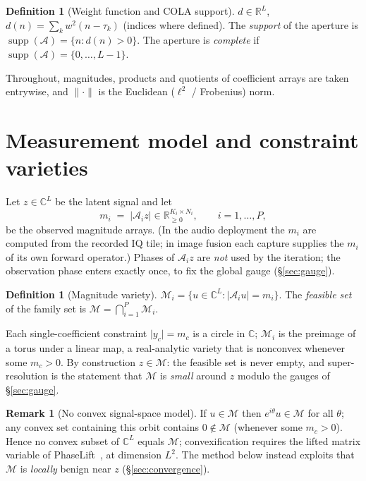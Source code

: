 \documentclass[11pt]{article}
\theoremstyle{definition}
\newtheorem{definition}[theorem]{Definition}
\newtheorem{remark}[theorem]{Remark}
\newcommand{\C}{\mathbb{C}}
\newcommand{\R}{\mathbb{R}}
\newcommand{\cA}{\mathcal{A}}
\newcommand{\cM}{\mathcal{M}}
\newcommand{\norm}[1]{\lVert #1\rVert}
\newcommand{\abs}[1]{\lvert #1\rvert}
\newcommand{\supp}{\operatorname{supp}}
\begin{document}
\begin{definition}[Weight function and COLA support]
$d\in\R^{L}$, $d(n)=\sum_{k} w^{2}(n-\tau_{k})$ (indices where defined).
The \emph{support} of the aperture is $\supp(\cA)=\{n: d(n)>0\}$.  The
aperture is \emph{complete} if $\supp(\cA)=\{0,\dots,L-1\}$.
\end{definition}

Throughout, magnitudes, products and quotients of coefficient arrays are
taken entrywise, and $\norm{\cdot}$ is the Euclidean ($\ell^{2}$ /
Frobenius) norm.

\section{Measurement model and constraint varieties}

Let $z\in\C^{L}$ be the latent signal and let
\[
  m_{i}\;=\;\abs{\cA_{i}z}\in\R_{\ge0}^{K_{i}\times N_{i}},
  \qquad i=1,\dots,P,
\]
be the observed magnitude arrays.  (In the audio deployment the $m_i$ are
computed from the recorded IQ tile; in image fusion each capture supplies
the $m_i$ of its own forward operator.)  Phases of $\cA_i z$ are
\emph{not} used by the iteration; the observation phase enters exactly once,
to fix the global gauge (\S\ref{sec:gauge}).

\begin{definition}[Magnitude variety]
$\cM_{i}=\{u\in\C^{L}: \abs{\cA_{i}u}=m_{i}\}$.  The \emph{feasible set} of
the family set is $\cM=\bigcap_{i=1}^{P}\cM_{i}$.
\end{definition}

Each single-coefficient constraint $\abs{y_c}=m_c$ is a circle in $\C$;
$\cM_i$ is the preimage of a torus under a linear map, a real-analytic
variety that is nonconvex whenever some $m_c>0$.  By construction
$z\in\cM$: the feasible set is never empty, and super-resolution is the
statement that $\cM$ is \emph{small} around $z$ modulo the gauges of
\S\ref{sec:gauge}.

\begin{remark}[No convex signal-space model]\label{rem:convex}
If $u\in\cM$ then $e^{i\theta}u\in\cM$ for all $\theta$; any convex set
containing this orbit contains $0\notin\cM$ (whenever some $m_c>0$).  Hence
no convex subset of $\C^{L}$ equals $\cM$; convexification requires the
lifted matrix variable of PhaseLift~\cite{candes2013}, at dimension
$L^{2}$.  The method below instead exploits that $\cM$ is
\emph{locally} benign near $z$ (\S\ref{sec:convergence}).
\end{remark}
\end{document}
